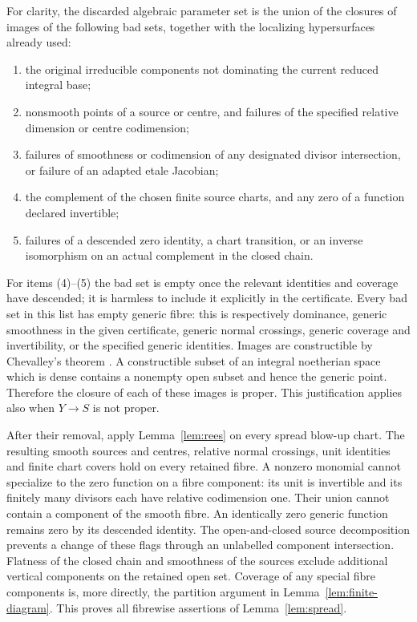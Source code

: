 For clarity, the discarded algebraic parameter set is the union of the
closures of images of the following bad sets, together with the
localizing hypersurfaces already used:
\begin{enumerate}
\item the original irreducible components not dominating the current
reduced integral base;
\item nonsmooth points of a source or centre, and failures of the
specified relative dimension or centre codimension;
\item failures of smoothness or codimension of any designated divisor
intersection, or failure of an adapted etale Jacobian;
\item the complement of the chosen finite source charts, and any zero
of a function declared invertible;
\item failures of a descended zero identity, a chart transition, or an
inverse isomorphism on an actual complement in the closed chain.
\end{enumerate}
For items (4)--(5) the bad set is empty once the relevant identities and
coverage have descended; it is harmless to include it explicitly in the
certificate. Every bad set in this list has empty generic fibre: this is
respectively dominance, generic smoothness in the given certificate,
generic normal crossings, generic coverage and invertibility, or the
specified generic identities. Images are constructible by Chevalley's
theorem \cite[Tag 054K]{Stacks}. A constructible subset of an integral
noetherian space which is dense contains a nonempty open subset and hence
the generic point. Therefore the closure of each of these images is
proper. This justification applies also when $Y\to S$ is not proper.

After their removal, apply Lemma~\ref{lem:rees} on every spread blow-up
chart. The resulting smooth sources and centres, relative normal crossings,
unit identities and finite chart covers hold on every retained fibre.
A nonzero monomial cannot specialize to the zero function on a fibre
component: its unit is invertible and its finitely many divisors each have
relative codimension one. Their union cannot contain a component of the
smooth fibre. An identically zero generic function remains zero by its
descended identity. The open-and-closed source decomposition prevents a
change of these flags through an unlabelled component intersection.
Flatness of the closed chain and smoothness of the sources exclude
additional vertical components on the retained open set. Coverage of any
special fibre components is, more directly, the partition argument in
Lemma~\ref{lem:finite-diagram}. This proves all fibrewise assertions of
Lemma~\ref{lem:spread}.

